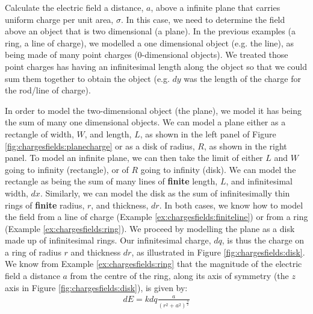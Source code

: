 \begin{example}{\label{ex:chargesfields:squarecircle}Calculate the electric field a distance, $a$, above a infinite plane that carries uniform charge per unit area, $\sigma$.}
In this case, we need to determine the field above an object that is two dimensional (a plane). In the previous examples (a ring, a line of charge), we modelled a one dimensional object (e.g. the line), as being made of many point charges (0-dimensional objects). We treated those point charges has having an infinitesimal length along the object so that we could sum them together to obtain the object (e.g. $dy$ was the length of the charge for the rod/line of charge).
 
In order to model the two-dimensional object (the plane), we model it has being the sum of many one dimensional objects. We can model a plane either as a rectangle of width, $W$, and length, $L$, as shown in the left panel of Figure \ref{fig:chargesfields:planecharge} or as a disk of radius, $R$, as shown in the right panel. To model an infinite plane, we can then take the limit of either $L$ and $W$ going to infinity (rectangle), or of $R$ going to infinity (disk). We can model the rectangle as being the sum of many lines of \textbf{finite} length, $L$, and infinitesimal width, $dx$. Similarly, we can model the disk as the sum of infinitesimally thin rings of \textbf{finite} radius, $r$, and thickness, $dr$. In both cases, we know how to model the field from a line of charge (Example \ref{ex:chargesfields:finiteline}) or from a ring (Example \ref{ex:chargesfields:ring}). 
We proceed by modelling the plane as a disk made up of infinitesimal rings. Our infinitesimal charge, $dq$, is thus the charge on a ring of radius $r$ and thickness $dr$, as illustrated in Figure \ref{fig:chargesfields:disk}.
We know from Example \ref{ex:chargesfields:ring} that the magnitude of the electric field a distance $a$ from the centre of the ring, along its axis of symmetry (the $z$ axis in Figure \ref{fig:chargesfields:disk}), is given by:
\begin{align*}
dE = kdq\frac{a}{(r^2+a^2)^\frac{3}{2}} 
\end{align*}

\end{example}
